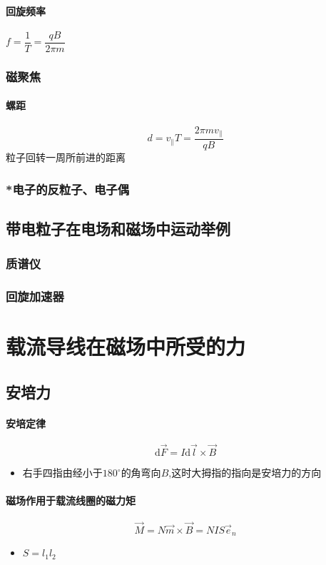 \documentclass[UTF8,a4paper,12pt,scheme=chinese]{ctexbook}
\newcommand{\sll}[1]{\overrightarrow{#1}}
\newcommand{\ud}{\mathrm{d}}
\begin{document}
	\paragraph{回旋频率}$ f=\dfrac{1}{T}=\dfrac{qB}{2\pi m} $
	
	\subsubsection{磁聚焦}
	\paragraph{螺距}
	$$ d=v_\parallel T=\dfrac{2\pi mv_\parallel}{qB}  $$
	粒子回转一周所前进的距离
	\subsubsection{*电子的反粒子、电子偶}
	\subsection{带电粒子在电场和磁场中运动举例}
	\subsubsection{质谱仪}
	\subsubsection{回旋加速器}
	\section{载流导线在磁场中所受的力}
	\subsection{安培力}
	\paragraph{安培定律}
	$$ \ud\sll{F} = I\ud\sll{l}\times\sll{B} $$
	\begin{itemize}
		\item 右手四指由经小于$ 180^\circ $的角弯向$ B $,这时大拇指的指向是安培力的方向
	\end{itemize}
	\paragraph{磁场作用于载流线圈的磁力矩}
	$$ \sll{M}=N\sll{m}\times\sll{B}=NIS\sll{e}_n $$
	\begin{itemize}
		\item $ S=l_1l_2 $
	\end{itemize}
\end{document}
